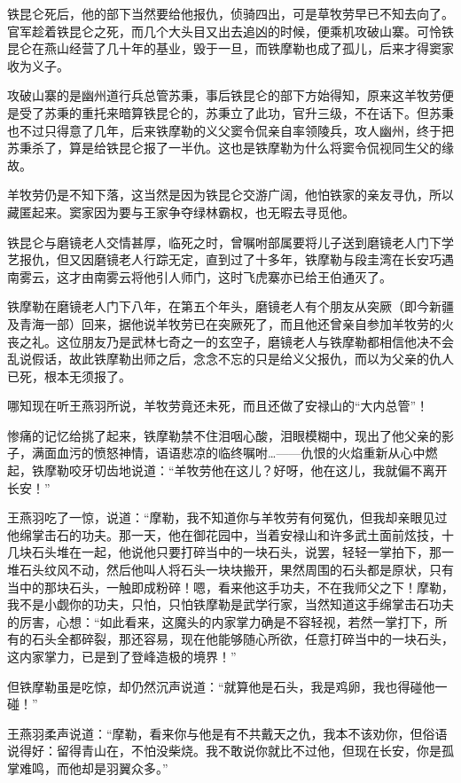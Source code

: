 \documentclass[12pt,oneside]{book}
\begin{document}
铁昆仑死后，他的部下当然要给他报仇，侦骑四出，可是草牧劳早已不知去向了。官军趁着铁昆仑之死，而几个大头目又出去追凶的时候，便乘机攻破山寨。可怜铁昆仑在燕山经营了几十年的基业，毁于一旦，而铁摩勒也成了孤儿，后来才得窦家收为义子。

攻破山寨的是幽州道行兵总管苏秉，事后铁昆仑的部下方始得知，原来这羊牧劳便是受了苏秉的重托来暗算铁昆仑的，苏秉立了此功，官升三级，不在话下。但苏秉也不过只得意了几年，后来铁摩勒的义父窦令侃亲自率领陵兵，攻人幽州，终于把苏秉杀了，算是给铁昆仑报了一半仇。这也是铁摩勒为什么将窦令侃视同生父的缘故。

羊牧劳仍是不知下落，这当然是因为铁昆仑交游广阔，他怕铁家的亲友寻仇，所以藏匿起来。窦家因为要与王家争夺绿林霸权，也无暇去寻觅他。

铁昆仑与磨镜老人交情甚厚，临死之时，曾嘱咐部属要将儿子送到磨镜老人门下学艺报仇，但又因磨镜老人行踪无定，直到过了十多年，铁摩勒与段圭湾在长安巧遇南雾云，这才由南雾云将他引人师门，这时飞虎寨亦已给王伯通灭了。

铁摩勒在磨镜老人门下八年，在第五个年头，磨镜老人有个朋友从突厥（即今新疆及青海一部）回来，据他说羊牧劳已在突厥死了，而且他还曾亲自参加羊牧劳的火丧之礼。这位朋友乃是武林七奇之一的玄空子，磨镜老人与铁摩勒都相信他决不会乱说假话，故此铁摩勒出师之后，念念不忘的只是给义父报仇，而以为父亲的仇人已死，根本无须报了。

哪知现在听王燕羽所说，羊牧劳竟还未死，而且还做了安禄山的``大内总管''！

惨痛的记忆给挑了起来，铁摩勒禁不住泪咽心酸，泪眼模糊中，现出了他父亲的影子，满面血污的愤怒神情，语语悲凉的临终嘱咐\ldots------仇恨的火焰重新从心中燃起，铁摩勒咬牙切齿地说道：``羊牧劳他在这儿？好呀，他在这儿，我就偏不离开长安！''

王燕羽吃了一惊，说道：``摩勒，我不知道你与羊牧劳有何冤仇，但我却亲眼见过他绵掌击石的功夫。那一天，他在御花园中，当着安禄山和许多武土面前炫技，十几块石头堆在一起，他说他只要打碎当中的一块石头，说罢，轻轻一掌拍下，那一堆石头纹风不动，然后他叫人将石头一块块搬开，果然周围的石头都是原状，只有当中的那块石头，一触即成粉碎！嗯，看来他这手功夫，不在我师父之下！摩勒，我不是小觑你的功夫，只怕，只怕铁摩勒是武学行家，当然知道这手绵掌击石功夫的厉害，心想：``如此看来，这魔头的内家掌力确是不容轻视，若然一掌打下，所有的石头全都碎裂，那还容易，现在他能够随心所欲，任意打碎当中的一块石头，这内家掌力，已是到了登峰造极的境界！''

但铁摩勒虽是吃惊，却仍然沉声说道：``就算他是石头，我是鸡卵，我也得碰他一碰！''

王燕羽柔声说道：``摩勒，看来你与他是有不共戴天之仇，我本不该劝你，但俗语说得好：留得青山在，不怕没柴烧。我不敢说你就比不过他，但现在长安，你是孤掌难鸣，而他却是羽翼众多。''
\end{document}
